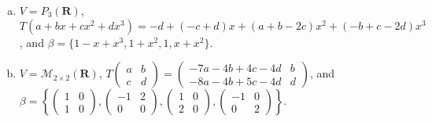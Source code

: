 \documentclass[a4paper,11pt]{article}
\newcommand{\R}{\mathbf{R}}
\newcommand{\M}{\mathcal{M}}
\begin{document}
\begin{enumerate}[(a)]
\item $V=P_3(\R)$, $T(a+bx+cx^2+dx^3)=-d+(-c+d)x+(a+b-2c)x^2+(-b+c-2d)x^3$, and
  $\beta=\{1-x+x^3,1+x^2,1,x+x^2\}$.

\item $V=\M_{2 \times 2}(\R)$,
  $T\left( \begin{smallmatrix}a&b\\c&d\end{smallmatrix} \right)=
  \left( \begin{smallmatrix}-7a-4b+4c-4d & b \\
           -8a-4b+5c-4d & d\end{smallmatrix} \right)$, and
       $\beta = \left\{ \left( \begin{smallmatrix}1&0\\1&0\end{smallmatrix}
         \right),
         \left( \begin{smallmatrix}-1&2\\0&0\end{smallmatrix} \right),
         \left( \begin{smallmatrix}1&0\\2&0\end{smallmatrix} \right),
       \left( \begin{smallmatrix}-1&0\\0&2\end{smallmatrix} \right)\right\}$. \\
\end{enumerate}
\end{document}

